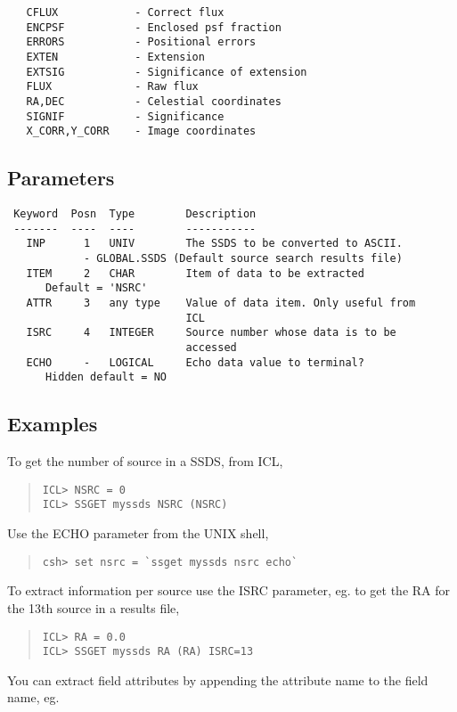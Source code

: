 \documentclass{book}
\renewcommand{\_}{{\tt\char'137}}     %
\begin{document}
\begin{verbatim}
   CFLUX            - Correct flux
   ENCPSF           - Enclosed psf fraction
   ERRORS           - Positional errors
   EXTEN            - Extension
   EXTSIG           - Significance of extension
   FLUX             - Raw flux
   RA,DEC           - Celestial coordinates
   SIGNIF           - Significance
   X_CORR,Y_CORR    - Image coordinates
\end{verbatim}
\subsection{Parameters}
\begin{verbatim}
 Keyword  Posn  Type        Description
 -------  ----  ----        -----------
   INP      1   UNIV        The SSDS to be converted to ASCII.
            - GLOBAL.SSDS (Default source search results file)
   ITEM     2   CHAR        Item of data to be extracted
      Default = 'NSRC'
   ATTR     3   any type    Value of data item. Only useful from
                            ICL
   ISRC     4   INTEGER     Source number whose data is to be
                            accessed
   ECHO     -   LOGICAL     Echo data value to terminal?
      Hidden default = NO

\end{verbatim}\subsection{Examples}
To get the number of source in a SSDS, from ICL,

\begin{quote}\begin{verbatim}
ICL> NSRC = 0
ICL> SSGET myssds NSRC (NSRC)
\end{verbatim}\end{quote}
Use the ECHO parameter from the UNIX shell,

\begin{quote}\begin{verbatim}
csh> set nsrc = `ssget myssds nsrc echo`
\end{verbatim}\end{quote}
To extract information per source use the ISRC parameter, eg. to
get the RA for the 13th source in a results file,

\begin{quote}\begin{verbatim}
ICL> RA = 0.0
ICL> SSGET myssds RA (RA) ISRC=13
\end{verbatim}\end{quote}
You can extract field attributes by appending the attribute name to
the field name, eg.
\end{document}
